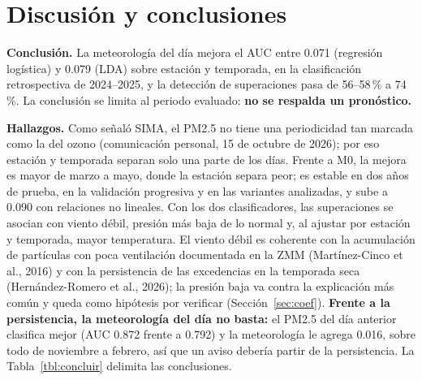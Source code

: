 \section{Discusión y conclusiones}\label{sec:conclusiones}

\textbf{Conclusión.} La meteorología del día mejora el AUC entre 0.071 (regresión logística) y 0.079 (LDA) sobre estación y temporada, en la clasificación retrospectiva de 2024–2025, y la detección de superaciones pasa de 56–58\,\% a 74\,\%. La conclusión se limita al periodo evaluado: \textbf{no se respalda un pronóstico.}

\textbf{Hallazgos.} Como señaló SIMA, el PM2.5 no tiene una periodicidad tan marcada como la del ozono (comunicación personal, 15 de octubre de 2026); por eso estación y temporada separan solo una parte de los días. Frente a M0, la mejora es mayor de marzo a mayo, donde la estación separa peor; es estable en dos años de prueba, en la validación progresiva y en las variantes analizadas, y sube a 0.090 con relaciones no lineales. Con los dos clasificadores, las superaciones se asocian con viento débil, presión más baja de lo normal y, al ajustar por estación y temporada, mayor temperatura. El viento débil es coherente con la acumulación de partículas con poca ventilación documentada en la ZMM (Martínez-Cinco et al., 2016) y con la persistencia de las excedencias en la temporada seca (Hernández-Romero et al., 2026); la presión baja va contra la explicación más común y queda como hipótesis por verificar (Sección~\ref{sec:coef}). \textbf{Frente a la persistencia, la meteorología del día no basta:} el PM2.5 del día anterior clasifica mejor (AUC 0.872 frente a 0.792) y la meteorología le agrega 0.016, sobre todo de noviembre a febrero, así que un aviso debería partir de la persistencia. La Tabla~\ref{tbl:concluir} delimita las conclusiones.

